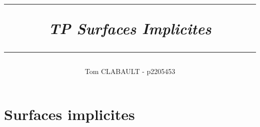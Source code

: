 \documentclass[11pt]{article}
\author{Tom CLABAULT - p2205453\\}
\title{
\noindent\rule{\textwidth}{1pt}
\textit{\textbf{TP Surfaces Implicites}}\\
\noindent\rule{\textwidth}{1pt}
}
\begin{document}
\maketitle

\section{Surfaces implicites}
        	
\end{document}
